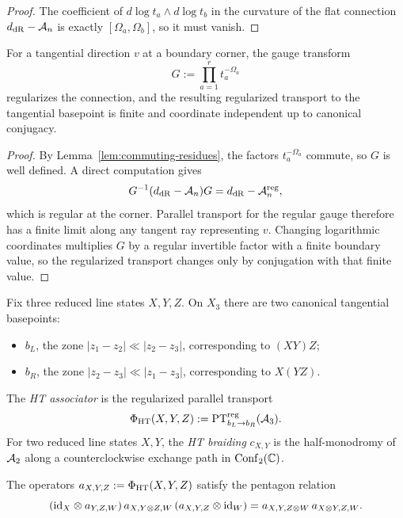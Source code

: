 \begin{proof}
The coefficient of $d\log t_a\wedge d\log t_b$ in the curvature of the flat connection $d_{\mathrm{dR}}-\mathcal A_n$ is exactly $[\Omega_a,\Omega_b]$, so it must vanish.
\end{proof}

\begin{lemma}%
For a tangential direction $v$ at a boundary corner, the gauge transform
\[
 G := \prod_{a=1}^r t_a^{-\Omega_a}
\]
regularizes the connection, and the resulting regularized transport to the tangential basepoint is finite and coordinate independent up to canonical conjugacy.
\end{lemma}

\begin{proof}
By Lemma~\ref{lem:commuting-residues}, the factors $t_a^{-\Omega_a}$ commute, so $G$ is well defined. A direct computation gives
\[
 G^{-1}(d_{\mathrm{dR}}-\mathcal A_n)G = d_{\mathrm{dR}}-\mathcal A_n^{\mathrm{reg}},
\]
which is regular at the corner. Parallel transport for the regular gauge therefore has a finite limit along any tangent ray representing $v$. Changing logarithmic coordinates multiplies $G$ by a regular invertible factor with a finite boundary value, so the regularized transport changes only by conjugation with that finite value.
\end{proof}

Fix three reduced line states $X,Y,Z$. On $X_3$ there are two canonical tangential basepoints:
\begin{itemize}
 \item $b_L$, the zone $|z_1-z_2|\ll |z_2-z_3|$, corresponding to $(XY)Z$;
 \item $b_R$, the zone $|z_2-z_3|\ll |z_1-z_3|$, corresponding to $X(YZ)$.
\end{itemize}

\begin{definition}%
The \emph{HT associator} is the regularized parallel transport
\[
 \Phi_{\mathrm{HT}}(X,Y,Z):=\mathrm{PT}^{\mathrm{reg}}_{b_L\to b_R}(\mathcal A_3).
\]
For two reduced line states $X,Y$, the \emph{HT braiding} $c_{X,Y}$ is the half-monodromy of $\mathcal A_2$ along a counterclockwise exchange path in $\mathrm{Conf}_2(\mathbb C)$.
\end{definition}

\begin{theorem}%
The operators $a_{X,Y,Z}:=\Phi_{\mathrm{HT}}(X,Y,Z)$ satisfy the pentagon relation
\[
 (\mathrm{id}_X\otimes a_{Y,Z,W})\,a_{X,Y\otimes Z,W}\,(a_{X,Y,Z}\otimes \mathrm{id}_W)
 =
 a_{X,Y,Z\otimes W}\,a_{X\otimes Y,Z,W}.
\]
\end{theorem}


